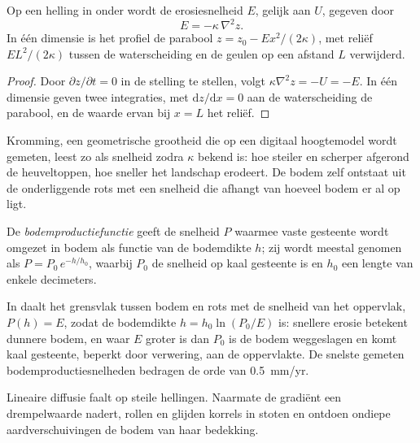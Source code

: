 \begin{proposition}\label{prop:b3:quantitative-geomorphology:curvature}
Op een helling in  onder  wordt de erosiesnelheid
$E$, gelijk aan $U$, gegeven door
\[
E = -\kappa\,\nabla^2 z .
\]
In één dimensie is het profiel de parabool $z = z_0 - E x^2/(2\kappa)$,
met reliëf $E L^2/(2\kappa)$ tussen de waterscheiding en de geulen op een afstand
$L$ verwijderd.
\end{proposition}

\begin{proof}
Door $\partial z/\partial t = 0$ in de stelling te stellen, volgt $\kappa\nabla^2 z =
-U = -E$. In één dimensie geven twee integraties, met $\mathrm{d}z/\mathrm{d}x =
0$ aan de waterscheiding de parabool, en de waarde ervan bij $x = L$ het reliëf.
\end{proof}

Kromming, een geometrische grootheid die op een digitaal hoogtemodel wordt gemeten, leest zo
als snelheid zodra $\kappa$ bekend is: hoe steiler en scherper afgerond de
heuveltoppen, hoe sneller het landschap erodeert. De bodem zelf ontstaat uit
de onderliggende rots met een snelheid die afhangt van hoeveel bodem er al op ligt.

\begin{definition}[Bodemproductiefunctie]\label{def:b3:quantitative-geomorphology:soil-production}
De \emph{bodemproductiefunctie} geeft
de snelheid $P$ waarmee vaste gesteente wordt omgezet in bodem als functie van de
bodemdikte $h$; zij wordt meestal genomen als $P = P_0\,e^{-h/h_0}$, waarbij
$P_0$ de snelheid op kaal gesteente is en $h_0$ een lengte van enkele decimeters.
\end{definition}

In  daalt het grensvlak tussen bodem en rots met de snelheid van het
oppervlak, $P(h) = E$, zodat de bodemdikte $h = h_0 \ln(P_0/E)$ is: snellere erosie betekent
dunnere bodem, en waar $E$ groter is dan $P_0$ is de bodem
weggeslagen en komt kaal gesteente, beperkt door verwering, aan de oppervlakte. De snelste
gemeten bodemproductiesnelheden bedragen de orde van \qty{0.5}{mm/yr}.

Lineaire diffusie faalt op steile hellingen. Naarmate de gradiënt een
drempelwaarde nadert, rollen en glijden korrels in stoten en ontdoen ondiepe
aardverschuivingen de bodem van haar bedekking.


